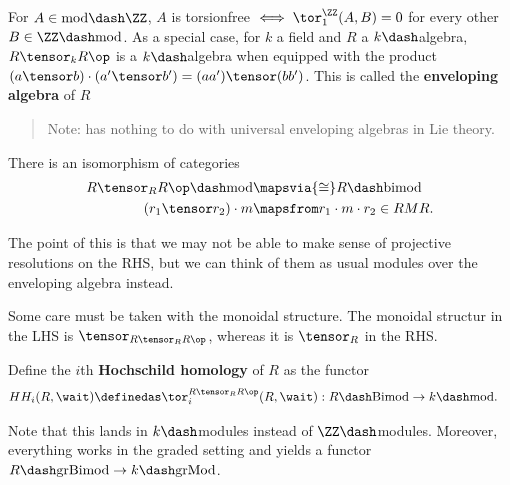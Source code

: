 \begin{remark}

For \(A\in \text{mod}\dash\ZZ\), \(A\) is torsionfree
\(\iff \tor_1^\ZZ(A, B) = 0\) for every other
\(B\in \ZZ\dash\text{mod}\). As a special case, for \(k\) a field and
\(R\) a \(k\dash\)algebra, \(R\tensor_k R\op\) is a \(k\dash\)algebra
when equipped with the product
\((a\tensor b)\cdot(a'\tensor b') = (aa') \tensor (bb')\). This is
called the \textbf{enveloping algebra} of \(R\)

\begin{quote}
Note: has nothing to do with universal enveloping algebras in Lie
theory.
\end{quote}

There is an isomorphism of categories
\begin{align*}
R\tensor_R R\op\dash\text{mod} &\mapsvia{\cong} R\dash\text{bimod} \\
(r_1\tensor r_2) \cdot m &\mapsfrom
r_1 \cdot m \cdot r_2 \in RMR 
.\end{align*}

The point of this is that we may not be able to make sense of projective
resolutions on the RHS, but we can think of them as usual modules over
the enveloping algebra instead.

\end{remark}

\begin{warning}

Some care must be taken with the monoidal structure. The monoidal
structur in the LHS is \(\tensor_{R\tensor_R R\op}\), whereas it is
\(\tensor_R\) in the RHS.

\end{warning}

\begin{definition}

Define the \(i\)th \textbf{Hochschild homology} of \(R\) as the functor
\begin{align*}
HH_i(R, \wait) \definedas \tor_i^{R\tensor_R R\op}(R, \wait) : R\dash\text{Bimod} &\to k\dash\text{mod}
.\end{align*}

\end{definition}

\begin{remark}

Note that this lands in \(k\dash\)modules instead of
\(\ZZ\dash\)modules. Moreover, everything works in the graded setting
and yields a functor \(R\dash\text{grBimod} \to k\dash\text{grMod}\).

\end{remark}

